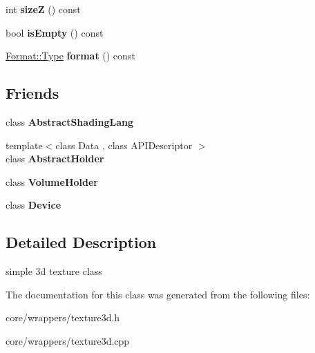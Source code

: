 \begin{DoxyCompactItemize}
\item 
\hypertarget{class_tempest_1_1_texture3d_aed972d83177d5415881f4db496304f97}{int {\bfseries size\+Z} () const }\label{class_tempest_1_1_texture3d_aed972d83177d5415881f4db496304f97}

\item 
\hypertarget{class_tempest_1_1_texture3d_aedde5ab746b491b2406a4ce3ee8e0609}{bool {\bfseries is\+Empty} () const }\label{class_tempest_1_1_texture3d_aedde5ab746b491b2406a4ce3ee8e0609}

\item 
\hypertarget{class_tempest_1_1_texture3d_a1e12a322b559694b0236ef2002fb7e8b}{\hyperlink{struct_tempest_1_1_abstract_texture_1_1_format_a231a1f516e53783bf72c713669b115b3}{Format\+::\+Type} {\bfseries format} () const }\label{class_tempest_1_1_texture3d_a1e12a322b559694b0236ef2002fb7e8b}

\end{DoxyCompactItemize}
\subsection*{Friends}
\begin{DoxyCompactItemize}
\item 
\hypertarget{class_tempest_1_1_texture3d_aae7a40a130def4c19f2b818dc9c51de2}{class {\bfseries Abstract\+Shading\+Lang}}\label{class_tempest_1_1_texture3d_aae7a40a130def4c19f2b818dc9c51de2}

\item 
\hypertarget{class_tempest_1_1_texture3d_a1b2eafcce9c46b8038fa4132f74088e7}{{\footnotesize template$<$class Data , class A\+P\+I\+Descriptor $>$ }\\class {\bfseries Abstract\+Holder}}\label{class_tempest_1_1_texture3d_a1b2eafcce9c46b8038fa4132f74088e7}

\item 
\hypertarget{class_tempest_1_1_texture3d_a2d28d4960c66ecddf6381f968d716a3c}{class {\bfseries Volume\+Holder}}\label{class_tempest_1_1_texture3d_a2d28d4960c66ecddf6381f968d716a3c}

\item 
\hypertarget{class_tempest_1_1_texture3d_a520fa05e0bf58785da428f7a0241eee2}{class {\bfseries Device}}\label{class_tempest_1_1_texture3d_a520fa05e0bf58785da428f7a0241eee2}

\end{DoxyCompactItemize}


\subsection{Detailed Description}
simple 3d texture class 

The documentation for this class was generated from the following files\+:\begin{DoxyCompactItemize}
\item 
core/wrappers/texture3d.\+h\item 
core/wrappers/texture3d.\+cpp\end{DoxyCompactItemize}
